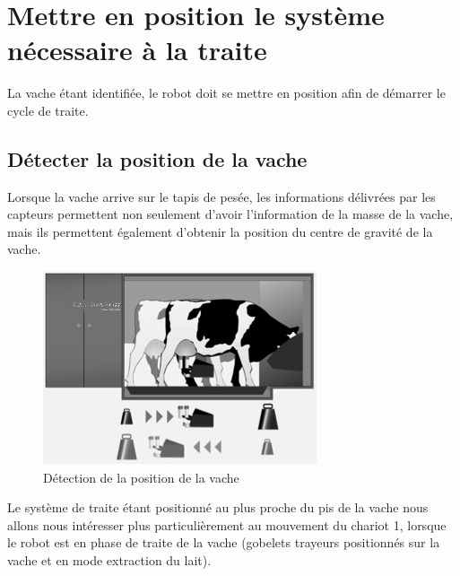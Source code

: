 
\section{Mettre en position le système nécessaire à la traite}

La vache étant identifiée, le robot doit se mettre en position afin de démarrer le cycle de traite.

\subsection{Détecter la position de la vache}

Lorsque la vache arrive sur le tapis de pesée, les informations délivrées par les capteurs permettent non seulement d’avoir l’information de la masse de la vache, mais ils permettent également d’obtenir la position du centre de gravité de la vache.

\begin{figure}[ht!]
\begin{center}
 \includegraphics[width=0.6\linewidth]{img/fig006}
\end{center}
\label{fig006}
\caption{Détection de la position de la vache}
\end{figure}

Le système de traite étant positionné au plus proche du pis de la vache nous allons nous intéresser plus particulièrement au mouvement du chariot 1, lorsque le robot est en phase de traite de la vache (gobelets trayeurs positionnés sur la vache et en mode extraction du lait).

